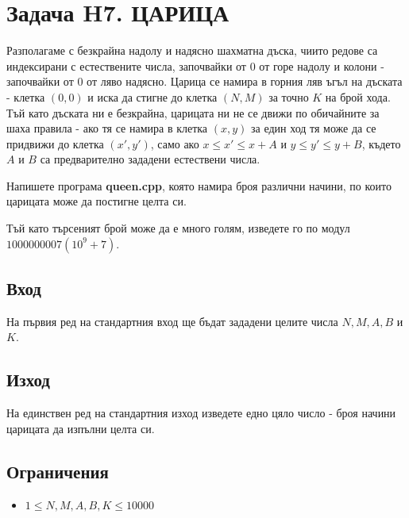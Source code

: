 \documentclass[12pt]{article}
\begin{document}
\section{Задача H7. ЦАРИЦА}

Разполагаме с безкрайна надолу и надясно шахматна дъска, чиито редове са индексирани с естествените числа, започвайки от $0$ от горе надолу и колони - започвайки от $0$ от ляво надясно. Царица се намира в горния ляв ъгъл на дъската - клетка $(0, 0)$ и иска да стигне до клетка $(N, M)$ за точно $K$ на брой хода. Тъй като дъската ни е безкрайна, царицата ни не се движи по обичайните за шаха правила - ако тя се намира в клетка $(x, y)$ за един ход тя може да се придвижи до клетка $(x', y')$, само ако $x \leq x' \leq x + A$ и  $y \leq y' \leq y + B$, където $A$ и $B$ са предварително зададени естествени числа.

Напишете програма \textbf{queen.cpp}, която намира броя различни начини, по които царицата може да постигне целта си.

Тъй като търсеният брой може да е много голям, изведете го по модул 
 $1000000007 (10^9 + 7)$.

\subsection{Вход}

На първия ред на стандартния вход ще бъдат зададени целите числа $N, M, A, B $ и $K$.

\subsection{Изход}

На единствен ред на стандартния изход изведете едно цяло число - броя начини царицата да изпълни целта си.


\subsection{Ограничения}

\vspace{0.1em}
\begin{itemize}
	\item $1 \leq N, M, A, B, K \leq 10000$
\end{itemize}
\end{document}
